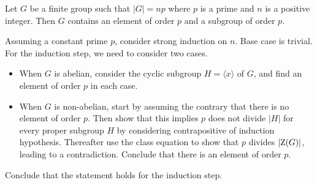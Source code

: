 \begin{theorem}[Cauchy]\label{thrm-cauchy}
    Let $G$ be a finite group such that $|G| = np$ where $p$ is a prime and $n$ is a positive integer. Then $G$ contains an element of order $p$ and a subgroup of order $p$.
\end{theorem}
\begin{proofsketch}
    Assuming a constant prime $p$, consider strong induction on $n$. Base case is trivial. For the induction step, we need to consider two cases.
    \begin{itemize}
        \item When $G$ is abelian, consider the cyclic subgroup $H = \langle x \rangle$ of $G$, and find an element of order $p$ in each case.
        \item When $G$ is non-abelian, start by assuming the contrary that there is no element of order $p$. Then show that this implies $p$ does not divide $|H|$ for every proper subgroup $H$ by considering contrapositive of induction hypothesis. Thereafter use the class equation to show that $p$ divides $|\mathrm{Z}(G)|$, leading to a contradiction. Conclude that there is an element of order $p$.
    \end{itemize}
    Conclude that the statement holds for the induction step.
\end{proofsketch}
